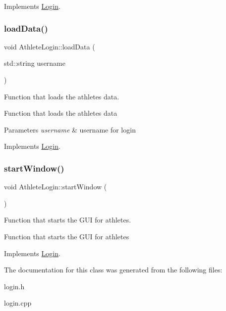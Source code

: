 Implements \mbox{\hyperlink{classLogin_afaf4316c2ce2eef1e645d8472d7e9ccd}{Login}}.

\mbox{\label{classAthleteLogin_a739caa9c5aed1003d2f19c49ec4a8854}} 
\subsubsection{\texorpdfstring{loadData()}{loadData()}}
{\footnotesize\ttfamily void Athlete\+Login\+::load\+Data (\begin{DoxyParamCaption}\item[{std\+::string}]{username }\end{DoxyParamCaption})\hspace{0.3cm}{\ttfamily [virtual]}}



Function that loads the athletes data. 

Function that loads the athletes data 
\begin{DoxyParams}{Parameters}
{\em username} & username for login \\
\hline
\end{DoxyParams}


Implements \mbox{\hyperlink{classLogin_aaa5bbdeef3c24022901a294af5f2be39}{Login}}.

\mbox{\label{classAthleteLogin_a2a6d59d4e84de8c26fd9736c9b569f8e}} 
\subsubsection{\texorpdfstring{startWindow()}{startWindow()}}
{\footnotesize\ttfamily void Athlete\+Login\+::start\+Window (\begin{DoxyParamCaption}{ }\end{DoxyParamCaption})\hspace{0.3cm}{\ttfamily [virtual]}}



Function that starts the G\+UI for athletes. 

Function that starts the G\+UI for athletes 

Implements \mbox{\hyperlink{classLogin_a91bc4d81c3d966d97320a988af1c4363}{Login}}.



The documentation for this class was generated from the following files\+:\begin{DoxyCompactItemize}
\item 
login.\+h\item 
login.\+cpp\end{DoxyCompactItemize}
